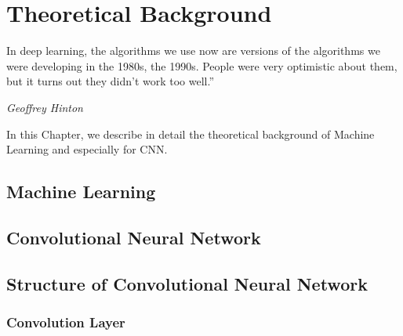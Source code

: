 


\chapter{Theoretical Background} %
\label{Chapter2} %

\epigraph{In deep learning, the algorithms we use now are versions of the algorithms we were developing in the 1980s, the 1990s. People were very optimistic about them, but it turns out they didn't work too well.” }{\textit{Geoffrey Hinton}}

\par In this Chapter, we describe in detail the theoretical background of Machine Learning and especially for CNN.
\par 

\section{Machine Learning}
\par
\section{Convolutional Neural Network}
\par 

\section{Structure of Convolutional Neural Network}


\subsection{Convolution Layer}

